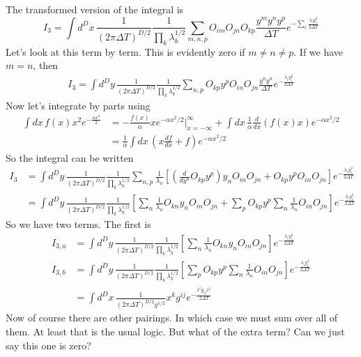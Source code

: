 The transformed version of the integral is 
\begin{equation}
I_3 = \int d^D x\, \frac{1}{(2\pi \Delta T)^{D/2}}\frac{1}{\prod_k \lambda_k^{1/2}}\sum_{m,n,p} O_{im}O_{jn}O_{kp}\frac{y^my^ny^p}{\Delta T} e^{-\sum_i\frac{\lambda_i y_i^2}{2\Delta T}}
\end{equation}
Let's look at this term by term.  This is evidently zero if $m\ne n\ne p$.  If we have $m=n$, then 
\begin{align}
I_3 = \int d^D y\, \frac{1}{(2\pi \Delta T)^{D/2}}\frac{1}{\prod_k \lambda_k^{1/2}} \sum_{n,p} O_{kp}y^p O_{in}O_{jn}\frac{y^ny^n}{\Delta T} e^{-\frac{\lambda_i y_i^2}{2\Delta T}}
\end{align}
Now let's integrate by parts using 
\begin{align}
\int dx\, f(x)x^2e^{-\frac{\alpha x^2}{2}}& = -\frac{f(x)}{\alpha}x e^{-\alpha x^2/2}\bigg|_{x=-\infty}^\infty + \int dx\, \frac{1}{\alpha}\frac{d}{dx}(f(x)x)e^{-\alpha x^2/2}\\
& = \frac{1}{\alpha}\int dx\, \left(x\frac{df}{dx} + f\right)e^{-\alpha x^2/2}
\end{align}
So the integral can be written 
\begin{align}
I_3 &= \int d^D y\, \frac{1}{(2\pi \Delta T)^{D/2}}\frac{1}{\prod_k \lambda_k^{1/2}} \sum_{n,p} \frac{1}{\lambda_n}\left[\left(\frac{d}{dy^n}O_{kp}y^p\right)y_nO_{in}O_{jn} + O_{kp}y^pO_{in}O_{jn} \right]e^{-\frac{\lambda_i y_i^2}{2\Delta T}}\\
&= \int d^D y\, \frac{1}{(2\pi \Delta T)^{D/2}}\frac{1}{\prod_k \lambda_k^{1/2}}\left[ \sum_{n} \frac{1}{\lambda_n}O_{kn}y_nO_{in}O_{jn} + \sum_pO_{kp}y^p\sum_n\frac{1}{\lambda_n}O_{in}O_{jn} \right]e^{-\frac{\lambda_i y_i^2}{2\Delta T}}
\end{align}
So we have two terms.  The first is 
\begin{align}
I_{3,a}&= \int d^D y\, \frac{1}{(2\pi \Delta T)^{D/2}}\frac{1}{\prod_k \lambda_k^{1/2}}\left[ \sum_{n} \frac{1}{\lambda_n}O_{kn}y_nO_{in}O_{jn} \right]e^{-\frac{\lambda_i y_i^2}{2\Delta T}}\\
I_{3,b}&= \int d^D y\, \frac{1}{(2\pi \Delta T)^{D/2}}\frac{1}{\prod_k \lambda_k^{1/2}}\left[\sum_pO_{kp}y^p\sum_n\frac{1}{\lambda_n}O_{in}O_{jn} \right]e^{-\frac{\lambda_i y_i^2}{2\Delta T}}\\
&= \int d^D x\, \frac{1}{(2\pi \Delta T)^{D/2}g^{1/2}}x^kg^{ij} e^{-\frac{x^i g_{ij} x^j}{2\Delta T}}
\end{align}
Now of course there are other pairings.  In which case we must sum over all of them.  At least that is the usual logic.  But what of the extra term?  Can we just say this one is zero?

